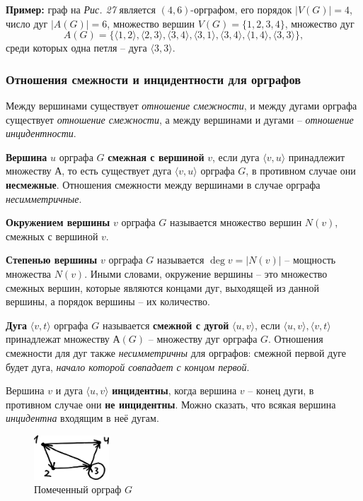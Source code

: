 \documentclass[12pt, a4paper]{article}
\newcommand{\irv}[1]{\langle #1 \rangle}
\begin{document}
\textbf{Пример:} граф на \textit{Рис. 27} является $(4,6)$-орграфом, его порядок $|V(G)| = 4$, число дуг $|A(G)| = 6$, множество вершин $V(G) = \{ 1,2,3,4 \}$, множество дуг
\[A(G) = \{ \irv{1,2}, \irv{2,3}, \irv{3,4}, \irv{3,1}, \irv{3,4}, \irv{1,4}, \irv{3,3} \}, \]
среди которых одна петля -- дуга $\irv{3,3}$.

\subsubsection{Отношения смежности и инцидентности для орграфов}

Между вершинами существует \textit{отношение смежности}, и между дугами орграфа существует \textit{отношение смежности}, а между вершинами и дугами -- \textit{отношение инцидентности}.

\textbf{Вершина} $u$ орграфа $G$ \textbf{смежная с вершиной} $v$, если дуга $\irv{v, u}$ принадлежит множеству $А$, то есть существует дуга $\irv{v, u}$ орграфа $G$, в противном случае они \textbf{несмежные}. Отношения смежности между вершинами в случае орграфа \textit{несимметричные}.

\textbf{Окружением вершины} $v$ орграфа $G$ называется множество вершин $N(v)$, смежных с вершиной $v$.

\textbf{Степенью вершины} $v$ орграфа $G$ называется $\deg v = |N(v)|$ -- мощность множества $N(v)$. Иными словами, окружение вершины -- это множество смежных вершин, которые являются концами дуг, выходящей из данной вершины, а порядок вершины -- их количество.

\textbf{Дуга} $\irv{v, t}$ орграфа $G$ называется \textbf{смежной с дугой} $\irv{u, v}$, если $\irv{u, v}, \irv{v, t}$ принадлежат множеству $А(G)$ -- множеству дуг орграфа $G$. Отношения смежности для дуг также \textit{несимметричны} для орграфов: смежной первой дуге будет дуга, \textit{начало которой совпадает с концом первой}.

Вершина $v$ и дуга $\irv{u, v}$ \textbf{инцидентны}, когда вершина $v$ -- конец дуги, в противном случае они
\textbf{не инцидентны}. Можно сказать, что всякая вершина \textit{инцидентна} входящим в неё дугам.

\begin{figure}
  \centering
  \vspace{2cm}
  \includegraphics[width=0.25\textwidth]{28}
  \vspace{-4mm}
  \caption{Помеченный орграф $G$}
\end{figure}
\end{document}
